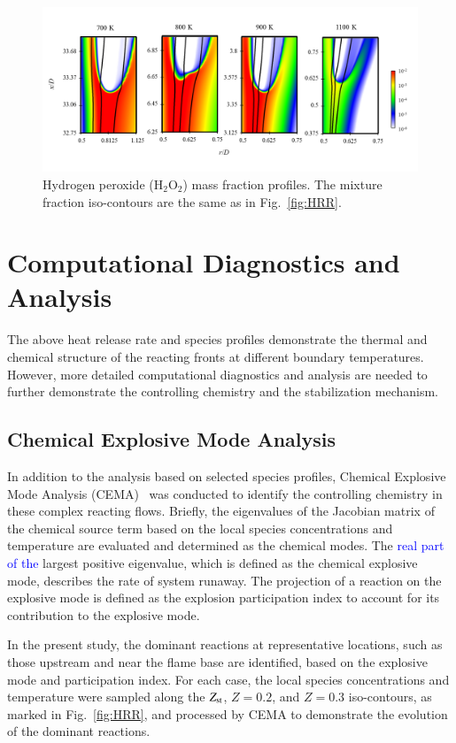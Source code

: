 \documentclass[review,3p,times]{elsarticle}
\begin{document}
\begin{figure}[t]
  \centering
  \scriptsize
  \vspace{-0.1in}
  \includegraphics[width=1.0\textwidth]{H2O2.png}
  \normalsize
  \vspace{-0.1in}
  \caption{Hydrogen peroxide (H$_2$O$_2$) mass fraction profiles.  The mixture fraction iso-contours are the same as in Fig.~\ref{fig:HRR}.}
  \label{fig:H2O2}
\end{figure}

\section{Computational Diagnostics and Analysis} \label{sec:diagnostics}
The above heat release rate and species profiles demonstrate the thermal and chemical structure of the reacting fronts at different boundary temperatures.  However, more detailed computational diagnostics and analysis are needed to further demonstrate the controlling chemistry and the stabilization mechanism.
\subsection{Chemical Explosive Mode Analysis}
In addition to the analysis based on selected species profiles, Chemical Explosive Mode Analysis (CEMA)~\cite{lu10,shan12} was conducted to identify the controlling chemistry in these complex reacting flows.  Briefly, the eigenvalues of the Jacobian matrix of the chemical source term based on the local species concentrations and temperature are evaluated and determined as the chemical modes.  The \textcolor{blue}{real part of the }largest positive eigenvalue, which is defined as the chemical explosive mode, describes the rate of system runaway.  The projection of a reaction on the explosive mode is defined as the explosion participation index to account for its contribution to the explosive mode.  

In the present study, the dominant reactions at representative locations, such as those upstream and near the flame base are identified, based on the explosive mode and participation index.  For each case, the local species concentrations and temperature were sampled along the $Z_{\rm st}$, $Z = 0.2$, and $Z = 0.3$ iso-contours, as marked in Fig.~\ref{fig:HRR}, and processed by CEMA to demonstrate the evolution of the dominant reactions.
\end{document}
